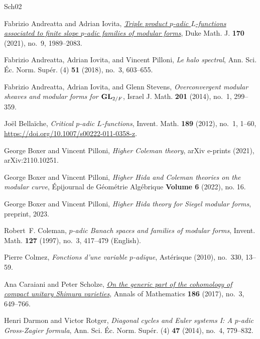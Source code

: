 \begin{thebibliography}{{Sch}02}

Fabrizio Andreatta and Adrian Iovita,
  \emph{\href{https://doi.org/10.1215/00127094-2020-0076}{Triple product
  {$p$}-adic {$L$}-functions associated to finite slope {$p$}-adic families of
  modular forms}}, Duke Math. J. \textbf{170} (2021), no.~9, 1989--2083.

Fabrizio Andreatta, Adrian Iovita, and Vincent Pilloni, \emph{Le halo
  spectral}, Ann. Sci. \'{E}c. Norm. Sup\'{e}r. (4) \textbf{51} (2018), no.~3,
  603--655. 

Fabrizio Andreatta, Adrian Iovita, and Glenn Stevens, \emph{Overconvergent
  modular sheaves and modular forms for {${\bf GL}_{2/F}$}}, Israel J. Math.
  \textbf{201} (2014), no.~1, 299--359.

Jo\"{e}l Bella\"{i}che, \emph{Critical {$p$}-adic {$L$}-functions}, Invent.
  Math. \textbf{189} (2012), no.~1, 1--60,
  \url{https://doi.org/10.1007/s00222-011-0358-z}. 

George {Boxer} and Vincent {Pilloni}, \emph{{Higher Coleman theory}}, arXiv
  e-prints (2021), arXiv:2110.10251.

George Boxer and Vincent Pilloni, \emph{{Higher Hida and Coleman theories on
  the modular curve}}, {Épijournal de Géométrie Algébrique} \textbf{{Volume
  6}} (2022), no. 16.

George {Boxer} and Vincent {Pilloni}, \emph{{Higher Hida theory for Siegel
  modular forms}}, preprint, 2023.

Robert~F. Coleman, \emph{{{\(p\)}}-adic {Banach} spaces and families of modular
  forms}, Invent. Math. \textbf{127} (1997), no.~3, 417--479 (English).

Pierre Colmez, \emph{Fonctions d'une variable {$p$}-adique}, Ast\'{e}risque
  (2010), no.~330, 13--59. 

Ana Caraiani and Peter Scholze,
  \emph{\href{http://www.jstor.org/stable/26395700}{On the generic part of the
  cohomology of compact unitary {S}himura varieties}}, Annals of Mathematics
  \textbf{186} (2017), no.~3, 649--766.

Henri Darmon and Victor Rotger, \emph{Diagonal cycles and {E}uler systems {I}:
  {A} {$p$}-adic {G}ross-{Z}agier formula}, Ann. Sci. \'{E}c. Norm. Sup\'{e}r.
  (4) \textbf{47} (2014), no.~4, 779--832. 


\end{thebibliography}
